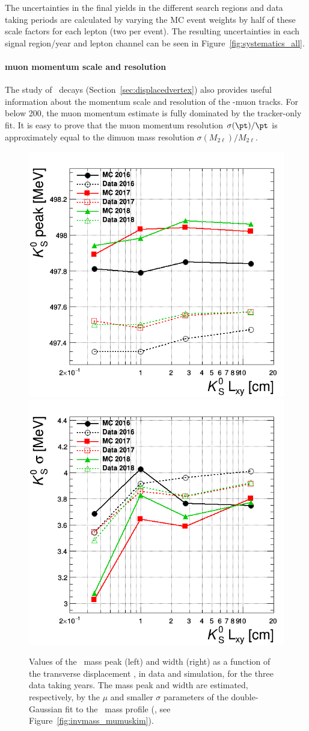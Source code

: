 The uncertainties in the final yields in the different search regions
and data taking periods are calculated by varying the MC event weights
by half of these scale factors for each \displ lepton (\ie two per
event). The resulting uncertainties in each signal region/year and
lepton channel can be seen in Figure~\ref{fig:systematics_all}. 

\paragraph{\Displ muon momentum scale and resolution}
\label{sec:nonpromptleptonscaleresol}
The study of \PKzS\ decays (Section~\ref{sec:displacedvertex}) also
provides useful information about the momentum scale and resolution of
the \displ-muon tracks. For \pt below 200\GeV, the muon momentum 
estimate is fully dominated by the tracker-only fit. It is easy to
prove that the muon momentum resolution $\sigma(\pt)/\pt$ is
approximately equal to the dimuon mass resolution
$\sigma(M_{2\ell})/M_{2\ell}$.
\begin{figure}[h!]
  \centering
  \includegraphics[width=.40\textwidth]{Figures/c6/systematics/scale_displMu.png}
  \includegraphics[width=.40\textwidth]{Figures/c6/systematics/resolution_displMu.png}
  \caption{Values of the \PKzS\ mass peak (left) and width (right) as
    a function of the transverse displacement \Deltwod, in data and
    simulation, for the three data taking years. The mass peak and
    width are estimated, respectively, by the $\mu$ and smaller
    $\sigma$ parameters of the double-Gaussian fit to the
    \PKzS\ mass profile (\eg, see Figure~\ref{fig:invmass_mumuskim}). \dani}
  \label{fig:displMuScaleResol}
\end{figure}
